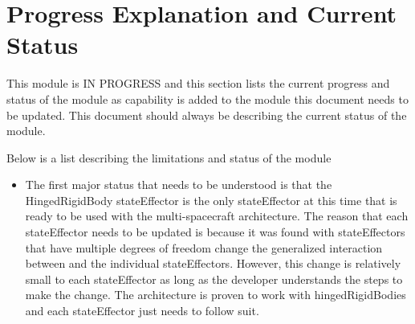 
\section{Progress Explanation and Current Status}

This module is IN PROGRESS and this section lists the current progress and status of the module as capability is added to the module this document needs to be updated. This document should always be describing the current status of the module. 

Below is a list describing the limitations and status of the module

\begin{itemize}
	\item The first major status that needs to be understood is that the HingedRigidBody stateEffector is the only stateEffector at this time that is ready to be used with the multi-spacecraft architecture. The reason that each stateEffector needs to be updated is because it was found with stateEffectors that have multiple degrees of freedom change the generalized interaction between  and the individual stateEffectors. However, this change is relatively small to each stateEffector as long as the developer understands the steps to make the change. The architecture is proven to work with hingedRigidBodies and each stateEffector just needs to follow suit.
	

\end{itemize}
